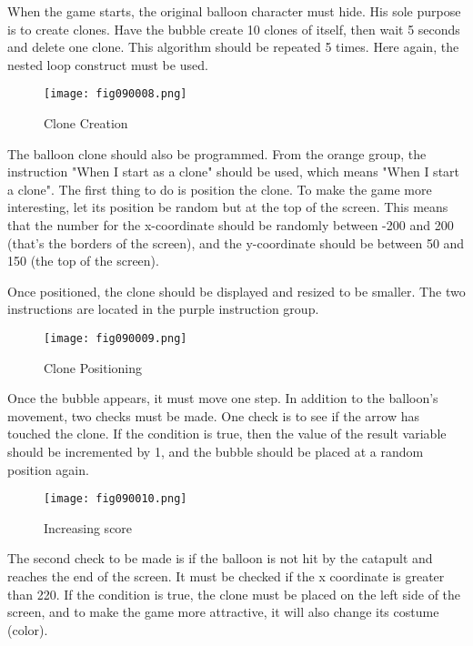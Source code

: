 When the game starts, the original balloon character must hide. His sole purpose is to create clones. Have the bubble create 10 clones of itself, then wait 5 seconds and delete one clone. This algorithm should be repeated 5 times. Here again, the nested loop construct must be used.

\begin{figure}[H]
   \centering
   \texttt{[image: fig090008.png]}
   \caption{Clone Creation}
\label{fig090008}
\end{figure}

The balloon clone should also be programmed. From the orange group, the instruction "When I start as a clone" should be used, which means "When I start a clone". The first thing to do is position the clone. To make the game more interesting, let its position be random but at the top of the screen. This means that the number for the x-coordinate should be randomly between -200 and 200 (that's the borders of the screen), and the y-coordinate should be between 50 and 150 (the top of the screen).

Once positioned, the clone should be displayed and resized to be smaller. The two instructions are located in the purple instruction group.

\begin{figure}[H]
   \centering
   \texttt{[image: fig090009.png]}
   \caption{Clone Positioning}
\label{fig090009}
\end{figure}

Once the bubble appears, it must move one step. In addition to the balloon's movement, two checks must be made. One check is to see if the arrow has touched the clone. If the condition is true, then the value of the result variable should be incremented by 1, and the bubble should be placed at a random position again.

\begin{figure}[H]
   \centering
   \texttt{[image: fig090010.png]}
   \caption{Increasing score}
\label{fig090010}
\end{figure}

The second check to be made is if the balloon is not hit by the catapult and reaches the end of the screen. It must be checked if the x coordinate is greater than 220. If the condition is true, the clone must be placed on the left side of the screen, and to make the game more attractive, it will also change its costume (color).


